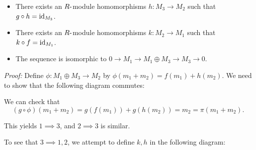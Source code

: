 \begin{itemize}
\item
  There exists an \(R{\hbox{-}}\)module homomorphisms \(h: M_3 \to M_2\) such
  that \(g\circ h = \text{id}_{M_3}\).
\item
  There exists an \(R{\hbox{-}}\)module homomorphisms \(k: M_2 \to M_1\) such
  that \(k\circ f = \text{id}_{M_1}\).
\item
  The sequence is isomorphic to
  \(0 \to M_1 \to M_1 \oplus M_3 \to M_3 \to 0\).
\end{itemize}

\emph{Proof:} Define \(\phi: M_1 \oplus M_3 \to M_2\) by
\(\phi(m_1 + m_2) = f(m_1) + h(m_2)\). We need to show that the
following diagram commutes:

\begin{center}
\end{center}

We can check that \[
(g\circ \phi)(m_1 + m_2) = g( f(m_1)) +  g(h(m_2)) = m_2 = \pi(m_1 + m_2).\]

This yields \(1 \implies 3\), and \(2 \implies 3\) is similar.

To see that \(3 \implies 1, 2\), we attempt to define \(k, h\) in the
following diagram:

\begin{center}
\end{center}

